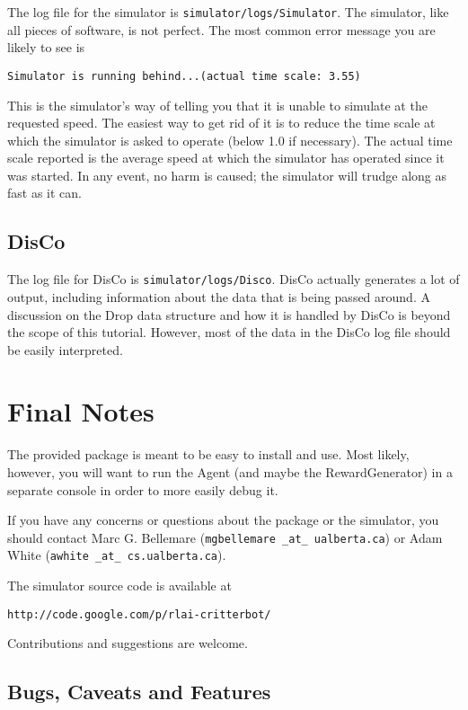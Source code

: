 \documentclass[12pt]{article}
\begin{document}
The log file for the simulator is \verb+simulator/logs/Simulator+. The 
simulator, like all pieces of software, is not perfect. The most common
error message you are likely to see is

\begin{verbatim}
Simulator is running behind...(actual time scale: 3.55)
\end{verbatim}

This is the simulator's way of telling you that it is unable to simulate
at the requested speed. The easiest way to get rid of it is to reduce the
time scale at which the simulator is asked to operate (below 1.0 if necessary).
The actual time scale reported is the average speed at which the simulator
has operated since it was started. In any event, no harm is caused; the 
simulator will trudge along as fast as it can.

\subsection{DisCo}

The log file for DisCo is \verb+simulator/logs/Disco+. DisCo actually generates 
a lot of output, including information about the data
that is being passed around. A discussion on the Drop data structure and how 
it is handled by DisCo is beyond the scope of this tutorial. However, most of 
the data in the DisCo log file should be easily interpreted.

\section{Final Notes}

The provided package is meant to be easy to install and use. Most likely,
however, you will want to run the Agent (and maybe the RewardGenerator) in
a separate console in order to more easily debug it.

If you have any concerns or questions about the package or the simulator,
you should contact Marc G. Bellemare (\texttt{mgbellemare \_at\_ ualberta.ca}) or Adam White (\texttt{awhite \_at\_ cs.ualberta.ca}).

The simulator source code is available at

\begin{verbatim}
http://code.google.com/p/rlai-critterbot/
\end{verbatim}

Contributions and suggestions are welcome.

\subsection{Bugs, Caveats and Features}
\end{document}
